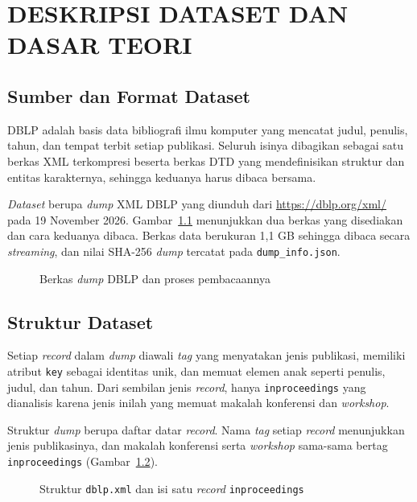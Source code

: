 \chapter{DESKRIPSI DATASET DAN DASAR TEORI}
\label{chap:dataset}

\section{Sumber dan Format Dataset}
\label{sec:dataset}
DBLP adalah basis data bibliografi ilmu komputer yang mencatat judul, penulis, tahun, dan tempat terbit setiap publikasi. Seluruh isinya dibagikan sebagai satu berkas XML terkompresi beserta berkas DTD yang mendefinisikan struktur dan entitas karakternya, sehingga keduanya harus dibaca bersama.

\textit{Dataset} berupa \textit{dump} XML DBLP \cite{dblpxml} yang diunduh dari \url{https://dblp.org/xml/} pada 19 November 2026. Gambar~\ref{fig:format-berkas} menunjukkan dua berkas yang disediakan dan cara keduanya dibaca. Berkas data berukuran 1,1 GB sehingga dibaca secara \textit{streaming}, dan nilai SHA-256 \textit{dump} tercatat pada \texttt{dump\_info.json}.

\begin{figure}[!htb]
\centering
{}
\caption{Berkas \textit{dump} DBLP dan proses pembacaannya}
\label{fig:format-berkas}
\end{figure}

\section{Struktur Dataset}
\label{sec:struktur}
Setiap \textit{record} dalam \textit{dump} diawali \textit{tag} yang menyatakan jenis publikasi, memiliki atribut \texttt{key} sebagai identitas unik, dan memuat elemen anak seperti penulis, judul, dan tahun. Dari sembilan jenis \textit{record}, hanya \texttt{inproceedings} yang dianalisis karena jenis inilah yang memuat makalah konferensi dan \textit{workshop}.

Struktur \textit{dump} berupa daftar datar \textit{record}. Nama \textit{tag} setiap \textit{record} menunjukkan jenis publikasinya, dan makalah konferensi serta \textit{workshop} sama-sama bertag \texttt{inproceedings} (Gambar~\ref{fig:struktur-xml}).

\begin{figure}[!htb]
\centering
{}
\caption{Struktur \texttt{dblp.xml} dan isi satu \textit{record} \texttt{inproceedings}}
\label{fig:struktur-xml}
\end{figure}

